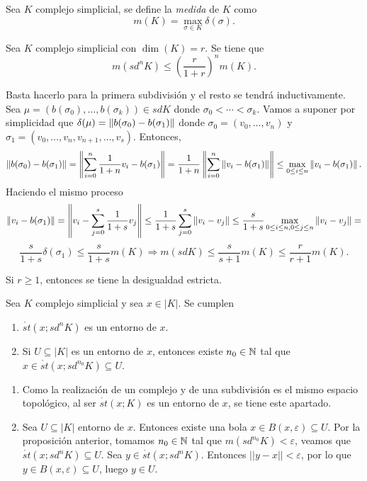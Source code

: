 \documentclass[HS.tex]{subfiles}
\begin{document}
\begin{defi}
Sea $K$ complejo simplicial, se define la \emph{medida} de $K$ como 
\[
m(K)=\max_{\sigma\in K}\delta(\sigma).
\]
\end{defi}

\begin{prop}
Sea $K$ complejo simplicial con $\dim(K)=r$. Se tiene que 
\[
m(sd^nK)\leq \left(\frac{r}{1+r}\right)^nm(K).
\]

\end{prop}
\begin{dem}
Basta hacerlo para la primera subdivisión y el resto se tendrá inductivamente. Sea $\mu=(b(\sigma_0),\dots, b(\sigma_k))\in sdK$ donde $\sigma_0<\cdots<\sigma_k$. Vamos a suponer por simplicidad que $\delta(\mu)=\left\lVert b(\sigma_0)-b(\sigma_1)\right\rVert$ donde $\sigma_0=(v_0,\dots, v_n)$ y $\sigma_1=(v_0,\dots, v_n,v_{n+1},\dots, v_s)$. Entonces, 
\[
\left\lVert b(\sigma_0)-b(\sigma_1)\right\rVert=\left\lVert\sum_{i=0}^n\frac{1}{1+n}v_i-b(\sigma_1)\right\rVert=\frac{1}{1+n}\left\lVert\sum_{i=0}^n\left\lVert v_i-b(\sigma_1)\right\rVert\right\rVert\leq \max_{0\leq i\leq n}\left\lVert v_i-b(\sigma_1)\right\rVert.
\]
Haciendo el mismo proceso 
\[
\left\lVert v_i-b(\sigma_1)\right\rVert=\left\lVert v_i-\sum_{j=0}^s\frac{1}{1+s}v_j\right\rVert\leq \frac{1}{1+s}\sum_{j=0}^s\left\lVert v_i-v_j\right\rVert\leq \frac{s}{1+s}\max_{0\leq i\leq n,0\leq j\leq n}\left\lVert v_i-v_j\right\rVert= 
\]
\[
\frac{s}{1+s}\delta(\sigma_1)\leq \frac{s}{1+s}m(K)\Rightarrow m(sdK)\leq \frac{s}{s+1}m(K)\leq \frac{r}{r+1}m(K).
\]
\QED
\end{dem}

\begin{nota}
Si $r\geq 1$, entonces se tiene la desigualdad estricta.
\end{nota}

\begin{prop}
Sea $K$ complejo simplicial y sea $x\in|K|$. Se cumplen
\begin{enumerate}
\item $\mathring{st}(x;sd^nK)$ es un entorno de $x$.
\item Si $U\subseteq|K|$ es un entorno de $x$, entonces existe $n_0\in\mathbb{N}$ tal que $x\in\mathring{st}(x;sd^{n_0}K)\subseteq U$. 
\end{enumerate}
\end{prop}
\begin{dem}
\begin{enumerate}
\item Como la realización de un complejo y de una subdivisión es el mismo espacio topológico, al ser $\mathring{st}(x;K)$ es un entorno de $x$, se tiene este apartado.
\item Sea $U\subseteq|K|$ entorno de $x$. Entonces existe una bola $x\in B(x,\varepsilon)\subseteq U$. Por la proposición anterior, tomamos $n_0\in\mathbb{N}$ tal que $m(sd^{n_0}K)<\varepsilon$, veamos que $\mathring{st}(x;sd^nK)\subseteq U$. Sea $y\in \mathring{st}(x;sd^nK)$. Entonces $||y-x||<\varepsilon$, por lo que $y\in B(x,\varepsilon)\subseteq U$, luego $y\in U$.
\end{enumerate}
\QED
\end{dem}
\end{document}
